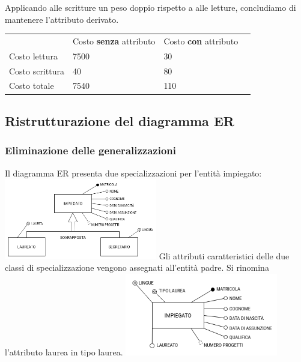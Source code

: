 \documentclass{article}
\begin{document}
Applicando alle scritture un peso doppio rispetto a alle letture, concludiamo di mantenere l'attributo derivato.
\begin{table}[H]
\renewcommand{\arraystretch}{1.2}
\centering
\begin{tabular}{|p{}|l|l|l|}
\cline{1-3}
& Costo \textbf{senza} attributo & Costo \textbf{con} attributo \\ \cline{1-3}
Costo lettura & 7500 & 30 \\ \cline{1-3}
Costo scrittura & 40 & 80 \\ \cline{1-3}
Costo totale & 7540 & 110 \\ \cline{1-3}
\end{tabular}
\end{table}

\newpage

\subsection{Ristrutturazione del diagramma ER}

\subsubsection{Eliminazione delle generalizzazioni}
Il diagramma ER presenta due specializzazioni per l'entità impiegato:
\newline
\newline
\includegraphics[width=0.5\textwidth]{er_R1.png}
\newline
\newline
Gli attributi caratteristici delle due classi di specializzazione vengono assegnati all'entità padre.
\newline
Si rinomina l'attributo laurea in tipo laurea.
\newline
\newline
\includegraphics[width=0.5\textwidth]{er_R2.png}
\end{document}
